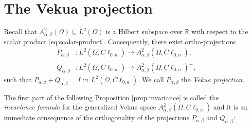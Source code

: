 \documentclass[12pt]{article}
\newcommand{\comment}[1]{\marginpar{\hfuzz=5ex
\scriptsize$\stackrel{?}{\longleftarrow}$\\\hspace*{-3ex}
{\fbox{\parbox{20ex}{\hfuzz=15ex \raggedright\sf#1 }}} }}
\def\R{\mathbb{R}}
\begin{document}
\section{The Vekua projection}\label{sec:Bergman-projection}
Recall that $A_{\alpha,\beta}^2(\Omega)\subseteq L^2(\Omega)$ is a Hilbert subspace over $\mathbb{R}$ with respect to the scalar product \eqref{eq:scalar-product}.
Consequently, there exist ortho-projections
\begin{align}\label{eq:ortho-projections}
 \nonumber  P_{\alpha,\beta} &\colon L^2(\Omega,C\ell_{0,n}) \to A_{\alpha,\beta}^2(\Omega,C\ell_{0,n}),\\
   Q_{\alpha,\beta} &\colon L^2(\Omega,C\ell_{0,n}) \to A_{\alpha,\beta}^2(\Omega,C\ell_{0,n})^{\bot},
\end{align}
such that $P_{\alpha,\beta}+Q_{\alpha,\beta}=I$ in $L^2(\Omega,C\ell_{0,n})$. We call $P_{\alpha,\beta}$ the \textit{Vekua projection}. 

The first part of the following Proposition \ref{prop:invariance} is called the \textit{invariance formula} for the generalized Vekua space $A_{\alpha,\beta}^2(\Omega, C\ell_{0,n})$ and it is an immediate consequence of the orthogonality of the projections $P_{\alpha,\beta}$
and $Q_{\alpha,\beta}$:
\end{document}
